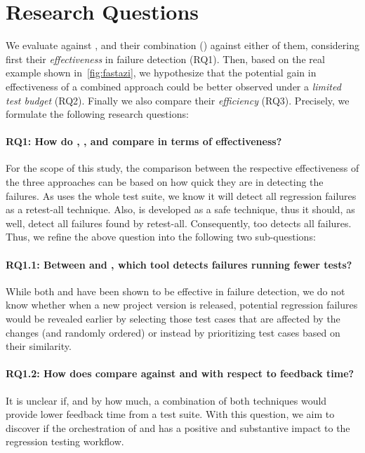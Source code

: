 \section{Research Questions}\label{sec:orch_rqs}

We evaluate \ek against \fs, and their combination (\fz) against either of them, considering first  their \textit{effectiveness} in  failure detection  (RQ1). Then, based on the real example shown in~\autoref{fig:fastazi}, we hypothesize that the potential gain in effectiveness of a combined approach could be better observed under a \textit{limited test budget} (RQ2). Finally we also compare their \textit{efficiency} (RQ3). Precisely,  we formulate the following research questions:

\paragraph{RQ1: How do \ek, \fs, and \fz compare in terms of effectiveness?}
For the scope of this study, the comparison between the respective effectiveness of the three approaches can be based on how quick they are in detecting the failures.  As \fs uses the whole test suite, we know it will detect all regression failures as a retest-all technique.
Also, \ek is developed as a safe \tcs technique, thus it should, as well, detect all failures found by retest-all.
Consequently, \fz too detects all failures.
Thus, we refine the above question into the following two sub-questions:

\paragraph{RQ1.1: Between \ek and \fs, which tool detects failures running fewer tests?}
While both \ek and \fs have been shown to be effective in failure  detection,  we do not  know whether when a new project version is released, potential regression failures would be revealed earlier by selecting those test cases that are affected by the changes (and randomly ordered) or instead by prioritizing test cases based on their similarity. 

\paragraph{RQ1.2: How does \fz compare against \ek and \fs with respect to feedback time?} 
It is unclear if, and by how much, a combination of both techniques would provide lower feedback time from a test suite.
With this question, we aim to discover if the orchestration of \tcs and \tcp has a positive and substantive impact to the regression testing workflow.

